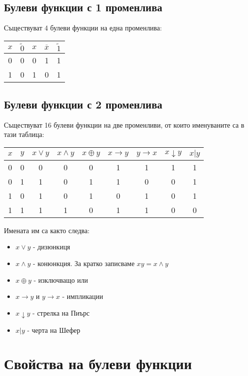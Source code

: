 \documentclass[fleqn,12pt]{article}
\begin{document}
\begin{flushleft}
\subsection{Булеви функции с 1 променлива}
Съществуват 4 булеви функции на една променлива:
\begin{center}
\begin{tabular}{ |c|c|c|c|c| } 
    \hline
    $x$ & $\widetilde{0}$ & $x$ & $\overline{x}$ & $\widetilde{1}$ \\ 
    \hline
    0 & 0 & 0 & 1 & 1 \\ 
    1 & 0 & 1 & 0 & 1 \\ 
    \hline
\end{tabular}
\end{center}

\subsection{Булеви функции с 2 променлива}
Съществуват 16 булеви функции на две променливи, от които именуваните са в тази таблица:
\begin{center}
\begin{tabular}{ |c|c|c|c|c|c|c|c|c| } 
    \hline
    $x$ & $y$ & $x \vee y$ & $x \wedge y$ & $x \oplus y$ & $x \rightarrow y$ & $y \rightarrow x$ & $x \downarrow y$ & $x | y$ \\ 
    \hline
    0 & 0 & 0 & 0 & 0 & 1 & 1 & 1 & 1 \\ 
    0 & 1 & 1 & 0 & 1 & 1 & 0 & 0 & 1 \\ 
    1 & 0 & 1 & 0 & 1 & 0 & 1 & 0 & 1 \\ 
    1 & 1 & 1 & 1 & 0 & 1 & 1 & 0 & 0 \\ 
    \hline
\end{tabular}
\end{center}
Имената им са както следва:
\begin{itemize}
    \item $x \vee y$ - дизюнкиця
    \item $x \wedge y$ - конюнкция. За кратко записваме $xy = x \wedge y$
    \item $x \oplus y$ - изключващо или
    \item $x \rightarrow y$ и $y \rightarrow x$ - импликации
    \item $x \downarrow y$ - стрелка на Пиърс
    \item $x|y$ - черта на Шефер
\end{itemize}

\section{Свойства на булеви функции}


\end{flushleft}
\end{document}
